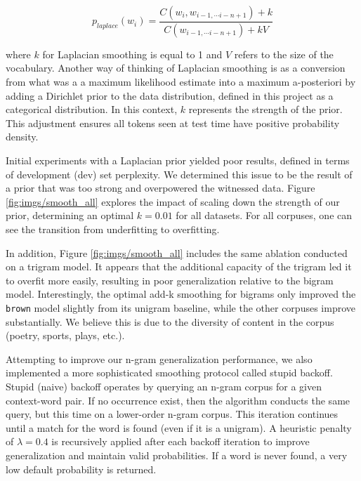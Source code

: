 \documentclass[11pt,a4paper]{article}
\begin{document}
\begin{equation}
  p_{laplace}(w_i) = \frac{C(w_i, w_{i - 1, \cdots i-n+1}) + k }{C(w_{i - 1, \cdots i-n+1}) + k V}
\end{equation}

where $k$ for Laplacian smoothing is equal to 1 and $V$ refers to the size of the vocabulary.
Another way of thinking of Laplacian smoothing is as a conversion from what was a
a maximum likelihood estimate into a maximum a-posteriori by adding a Dirichlet prior to the data distribution, defined in this project as a 
categorical distribution. In this context, $k$ represents the strength of the prior. This adjustment ensures all tokens seen at test time
have positive probability density.

Initial experiments with a Laplacian prior yielded poor results, defined in terms of development (dev) set perplexity. We 
determined this issue to be the result of a prior that was too strong and overpowered the witnessed data. Figure \ref{fig:imgs/smooth_all} explores the impact of scaling down the strength of our prior, determining an optimal $k=0.01$ for all datasets. For all corpuses, one can see the transition from underfitting to overfitting.

In addition, Figure \ref{fig:imgs/smooth_all} includes the same ablation conducted on a trigram model. It appears that the 
additional capacity of the trigram led it to overfit more easily, resulting in poor generalization relative to the bigram model.
Interestingly, the optimal add-k smoothing for bigrams only improved the \texttt{brown} model slightly from its unigram baseline, while
the other corpuses improve substantially. We believe this is due to the diversity of content in the corpus (poetry, sports, plays, etc.).

Attempting to improve our n-gram generalization performance, we also implemented a more sophisticated smoothing protocol called
stupid backoff. Stupid (naive) backoff \cite{brants2007large} operates by querying an n-gram corpus
for a given context-word pair. If no occurrence exist, then the algorithm conducts the same query, but this time on a lower-order n-gram corpus. 
This iteration continues until a match for the word is found (even if it is a unigram). A heuristic penalty of $\lambda = 0.4$ is recursively applied
after each backoff iteration to improve generalization and maintain valid probabilities. If a word is never found, a very low default probability is returned.


\end{document}
